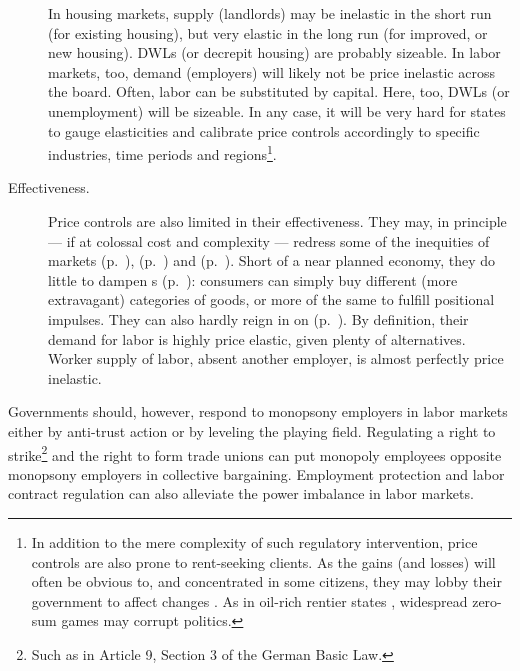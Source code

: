 \begin{description}
		In housing markets, supply (landlords) may be inelastic in the short run (for existing housing), but very elastic in the long run (for improved, or new housing). \glspl{DWL} (or decrepit housing) are probably sizeable. In labor markets, too, demand (employers) will likely not be price inelastic across the board. Often, labor can be substituted by capital. Here, too, \glspl{DWL} (or unemployment) will be sizeable. In any case, it will be very hard for states to gauge elasticities and calibrate price controls accordingly to specific industries, time periods and regions\footnote{
			In addition to the mere complexity of such regulatory intervention, price controls are also prone to rent-seeking clients. As the gains (and losses) will often be obvious to, and concentrated in some citizens, they may lobby their government to affect changes \citep{Peltzman1976,Posner1975,Krueger1974}. As in oil-rich rentier states \citep{Beblawi1990}, widespread zero-sum games may corrupt politics.}.
		
	\item[Effectiveness.] 
		Price controls are also limited in their effectiveness. They may, in principle --- if at colossal cost and complexity --- redress some of the inequities of  markets (p.~\pageref{sec:winne-take-all}),  (p.~\pageref{sec:different-budget-constraints}) and  (p.~\pageref{sec:diminishing-marginal-utility}). Short of a near planned economy, they do little to dampen s (p.~\pageref{sec:positional-race}):  consumers can simply buy different (more extravagant) categories of goods, or more of the same to fulfill positional impulses. They can also hardly reign in on  (p.~\pageref{sec:monopsony-employers}). By definition, their demand for labor is highly price elastic, given plenty of alternatives. Worker supply of labor, absent another employer, is almost perfectly price inelastic. 
\end{description}

Governments should, however, respond to monopsony employers in labor markets either by anti-trust action or by leveling the playing field. Regulating a right to strike\footnote{
	Such as in Article 9, Section 3 of the German Basic Law.} 
and the right to form trade unions can put monopoly employees opposite monopsony employers in collective bargaining. Employment protection and labor contract regulation can also alleviate the power imbalance in labor markets.

